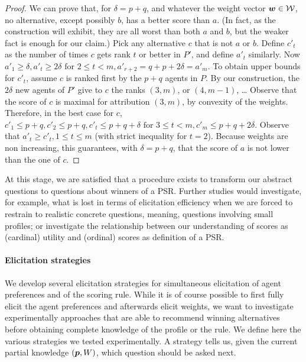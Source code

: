 \documentclass[sigconf, anonymous]{aamas}
\begin{document}
\begin{proof}
	We can prove that, for $\delta = p+q$, and whatever the weight vector $\bm{w} \in \mathcal{W}$, no alternative, except possibly $b$, has a better score than $a$. 
	(In fact, as the construction will exhibit, they are all worst than both $a$ and $b$, but the weaker fact is enough for our claim.)
	Pick any alternative $c$ that is not $a$ or $b$. 
	Define $c'_t$ as the number of times $c$ gets rank $t$ or better in $P'$, and define $a'_t$ similarly. Now $a'_1 ≥ \delta, a'_t ≥ 2\delta \text{ for } 2 ≤ t < m, a'_{r+2} = q+p+2\delta = a'_m$. To obtain upper bounds for $c'_t$, assume $c$ is ranked first by the $p+q$ agents in $P$. By our construction, the  $2 \delta$ new agents of $P'$ give to $c$ the ranks $(3, m)$, or $(4, m-1)$, … Observe that the score of $c$ is maximal for attribution $(3, m)$, by convexity of the weights. Therefore, in the best case for $c$, $c'_1 ≤ p + q, c'_2 ≤ p+q, c'_t ≤ p+q+\delta \text{ for } 3 ≤ t < m, c'_m ≤ p+q+2\delta$. Observe that $a'_t ≥ c'_t, 1 ≤ t ≤ m$ (with strict inequality for $t=2$). Because weights are non increasing, this guarantees, with $\delta = p + q$, that the score of $a$ is not lower than the one of $c$.
\end{proof}
At this stage, we are satisfied that a procedure exists to transform our abstract questions to questions about winners of a PSR. Further studies would investigate, for example, what is lost in terms of elicitation efficiency when we are forced to restrain to realistic concrete questions, meaning, questions involving small profiles; or investigate the relationship between our understanding of scores as (cardinal) utility and (ordinal) scores as definition of a PSR.

\paragraph{Elicitation strategies}
We develop several elicitation strategies for simultaneous elicitation of agent preferences and of the scoring rule.
While it is of course possible to first fully elicit the agent preferences and afterwards elicit weights, we want to investigate experimentally approaches that are able to recommend winning alternatives before obtaining complete knowledge of the profile or the rule.
We define here the various strategies we tested experimentally. A strategy tells us, given the current partial knowledge $({\bm{p}}, W)$, which question should be asked next.
\end{document}
